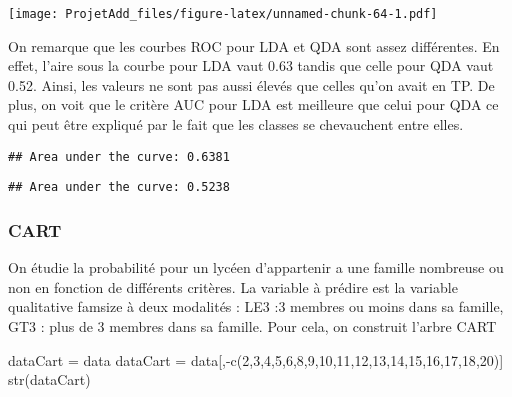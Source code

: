 \documentclass[
]{article}
\newenvironment{Shaded}{\begin{snugshade}}{\end{snugshade}}
\newcommand{\DecValTok}[1]{\textcolor[rgb]{0.00,0.00,0.81}{#1}}
\newcommand{\FunctionTok}[1]{\textcolor[rgb]{0.00,0.00,0.00}{#1}}
\newcommand{\NormalTok}[1]{#1}
\newcommand{\OtherTok}[1]{\textcolor[rgb]{0.56,0.35,0.01}{#1}}
\newcommand{\SpecialCharTok}[1]{\textcolor[rgb]{0.00,0.00,0.00}{#1}}
\begin{document}
\texttt{[image: ProjetAdd\_files/figure-latex/unnamed-chunk-64-1.pdf]}

On remarque que les courbes ROC pour LDA et QDA sont assez différentes.
En effet, l'aire sous la courbe pour LDA vaut 0.63 tandis que celle pour
QDA vaut 0.52. Ainsi, les valeurs ne sont pas aussi élevés que celles
qu'on avait en TP. De plus, on voit que le critère AUC pour LDA est
meilleure que celui pour QDA ce qui peut être expliqué par le fait que
les classes se chevauchent entre elles.

\begin{Shaded}
\end{Shaded}

\begin{verbatim}
## Area under the curve: 0.6381
\end{verbatim}

\begin{Shaded}
\end{Shaded}

\begin{verbatim}
## Area under the curve: 0.5238
\end{verbatim}

\hypertarget{cart}{%
\subsubsection{CART}\label{cart}}

On étudie la probabilité pour un lycéen d'appartenir a une famille
nombreuse ou non en fonction de différents critères. La variable à
prédire est la variable qualitative famsize à deux modalités : LE3 :3
membres ou moins dans sa famille, GT3 : plus de 3 membres dans sa
famille. Pour cela, on construit l'arbre CART

\begin{Shaded}
\begin{Highlighting}[]
\NormalTok{dataCart }\OtherTok{=}\NormalTok{ data}
\NormalTok{dataCart }\OtherTok{=}\NormalTok{ data[,}\SpecialCharTok{{-}}\FunctionTok{c}\NormalTok{(}\DecValTok{2}\NormalTok{,}\DecValTok{3}\NormalTok{,}\DecValTok{4}\NormalTok{,}\DecValTok{5}\NormalTok{,}\DecValTok{6}\NormalTok{,}\DecValTok{8}\NormalTok{,}\DecValTok{9}\NormalTok{,}\DecValTok{10}\NormalTok{,}\DecValTok{11}\NormalTok{,}\DecValTok{12}\NormalTok{,}\DecValTok{13}\NormalTok{,}\DecValTok{14}\NormalTok{,}\DecValTok{15}\NormalTok{,}\DecValTok{16}\NormalTok{,}\DecValTok{17}\NormalTok{,}\DecValTok{18}\NormalTok{,}\DecValTok{20}\NormalTok{)]}
\FunctionTok{str}\NormalTok{(dataCart)}
\end{Highlighting}
\end{Shaded}
\end{document}
